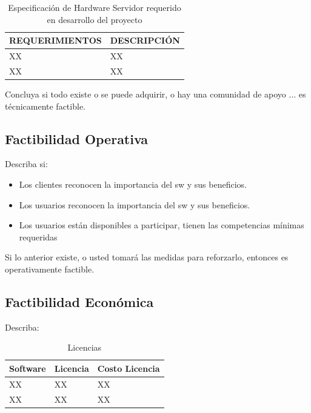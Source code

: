  \begin{table}[H]
    \begin{center}
        \begin{tabular}{ | m{5cm} | m{6cm} | }
            \hline \textbf{REQUERIMIENTOS} & \textbf{DESCRIPCIÓN }\\ \hline
            XX & XX  \\ \hline
            XX & XX  \\ \hline
        \end{tabular}
        \caption{Especificación de Hardware Servidor requerido en desarrollo del proyecto}
    \end{center}
\end{table}


Concluya si todo existe o se puede adquirir, o hay una comunidad de apoyo ... es técnicamente factible.


\subsection{Factibilidad Operativa}

Describa si:
\begin{itemize}
    \item Los clientes reconocen la importancia del sw y sus beneficios.
    \item Los usuarios reconocen la importancia del sw y sus beneficios.
    \item Los usuarios están disponibles a participar, tienen las competencias mínimas requeridas
\end{itemize}
Si lo anterior existe, o usted tomará las medidas para reforzarlo, entonces es operativamente factible.


\subsection{Factibilidad Económica}
Describa:

 \begin{table}[H]
    \begin{center}
        \begin{tabular}{ |l|l|l| }
            \hline 
            \textbf{Software} & \textbf{Licencia} & \textbf{Costo Licencia}\\ \hline
            XX & XX & XX  \\ \hline
            XX & XX & XX \\ \hline
        \end{tabular}
        \caption{Licencias}
    \end{center}
\end{table}

